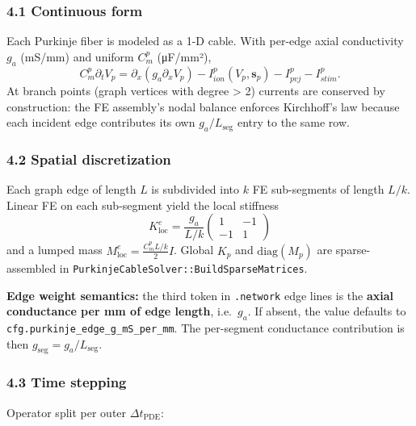 \documentclass[
  11pt,
]{article}
\begin{document}
\hypertarget{continuous-form}{%
\subsubsection{4.1 Continuous form}\label{continuous-form}}

Each Purkinje fiber is modeled as a 1-D cable. With per-edge axial
conductivity \(g_a\) (mS/mm) and uniform \(C_m^p\) (μF/mm²),
\[C_m^p \partial_t V_p = \partial_x (g_a \partial_x V_p) - I_{ion}^p(V_p, \mathbf{s}_p) - I_{pvj}^p - I_{stim}^p.\]
At branch points (graph vertices with degree \textgreater{} 2) currents
are conserved by construction: the FE assembly's nodal balance enforces
Kirchhoff's law because each incident edge contributes its own
\(g_a/L_\mathrm{seg}\) entry to the same row.

\hypertarget{spatial-discretization}{%
\subsubsection{4.2 Spatial
discretization}\label{spatial-discretization}}

Each graph edge of length \(L\) is subdivided into \(k\) FE sub-segments
of length \(L/k\). Linear FE on each sub-segment yield the local
stiffness
\[K^e_{\mathrm{loc}} = \frac{g_a}{L/k} \begin{pmatrix} 1 & -1 \\ -1 & 1 \end{pmatrix}\]
and a lumped mass \(M^e_{\mathrm{loc}} = \tfrac{C_m^p L/k}{2} I\).
Global \(K_p\) and \(\mathrm{diag}(M_p)\) are sparse-assembled in
\texttt{PurkinjeCableSolver::BuildSparseMatrices}.

\textbf{Edge weight semantics:} the third token in \texttt{.network}
edge lines is the \textbf{axial conductance per mm of edge length},
i.e.~\(g_a\). If absent, the value defaults to
\texttt{cfg.purkinje\_edge\_g\_mS\_per\_mm}. The per-segment conductance
contribution is then \(g_\mathrm{seg} = g_a / L_\mathrm{seg}\).

\hypertarget{time-stepping}{%
\subsubsection{4.3 Time stepping}\label{time-stepping}}

Operator split per outer \(\Delta t_\mathrm{PDE}\):
\end{document}
